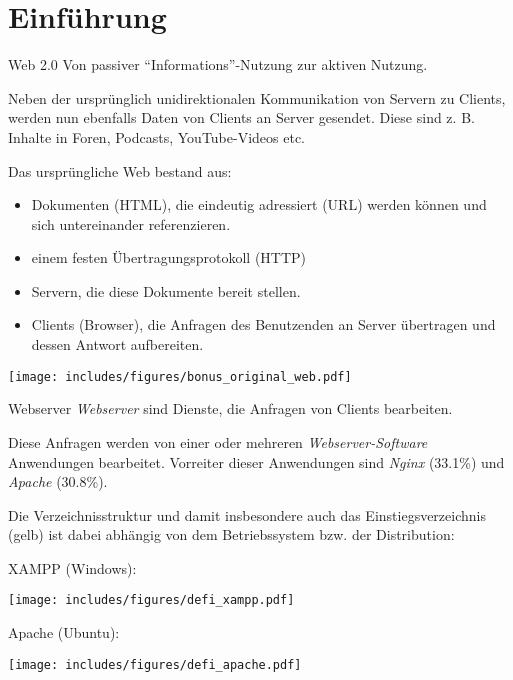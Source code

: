 \section{Einführung}

\begin{bonus}{Web 2.0}
    Von passiver \enquote{Informations}-Nutzung zur aktiven Nutzung.
    
    Neben der ursprünglich unidirektionalen Kommunikation von Servern zu Clients, werden nun ebenfalls Daten von Clients an Server gesendet.
    Diese sind z. B. Inhalte in Foren, Podcasts, YouTube-Videos etc.
    
    Das ursprüngliche Web bestand aus:
    \begin{itemize}
        \item Dokumenten (HTML), die eindeutig adressiert (URL) werden können und sich untereinander referenzieren.
        \item einem festen Übertragungsprotokoll (HTTP)
        \item Servern, die diese Dokumente bereit stellen.
        \item Clients (Browser), die Anfragen des Benutzenden an Server übertragen und dessen Antwort aufbereiten.
    \end{itemize}
    
    \begin{center}
        \texttt{[image: includes/figures/bonus\_original\_web.pdf]}
    \end{center}
\end{bonus}

\begin{defi}{Webserver}
    \emph{Webserver} sind Dienste, die Anfragen von Clients bearbeiten.
    
    Diese Anfragen werden von einer oder mehreren \emph{Webserver-Software} Anwendungen bearbeitet.
    Vorreiter dieser Anwendungen sind \emph{Nginx} (33.1\%) und \emph{Apache} (30.8\%).
    
    Die Verzeichnisstruktur und damit insbesondere auch das Einstiegsverzeichnis (gelb) ist dabei abhängig von dem Betriebssystem bzw. der Distribution:
    
    \begin{minipage}[t]{.5\textwidth}
        XAMPP (Windows):
        
        \centering
        \texttt{[image: includes/figures/defi\_xampp.pdf]}
    \end{minipage}%
    \begin{minipage}[t]{.5\textwidth}
        Apache (Ubuntu):
        
        \centering
        \texttt{[image: includes/figures/defi\_apache.pdf]}
    \end{minipage}
\end{defi}

